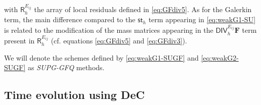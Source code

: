 \documentclass[a4paper,10pt]{article}
\newcommand{\id}{\mathds{1}}
\begin{document}
with $\mathsf{R}_h^{E_{ij}}$ the array of local residuals defined in \eqref{eq:GFdiv5}.  As for the Galerkin term,   the main difference compared to the $\mathsf{st}_h$ term appearing in
\eqref{eq:weakG1-SU} is related to the modification of the mass matrices appearing in the $\textsf{DIV}_h^{E_{ij}}  \mathbf{F}$  term  present in 
$\mathsf{R}_h^{E_{ij}}$ (cf. equations \eqref{eq:GFdiv5} and \eqref{eq:GFdiv3}).  

We will denote the schemes defined by \eqref{eq:weakG1-SUGF} and \eqref{eq:weakG2-SUGF} as \emph{SUPG-GFQ} methods.

\subsection{Time evolution using DeC}
\end{document}
